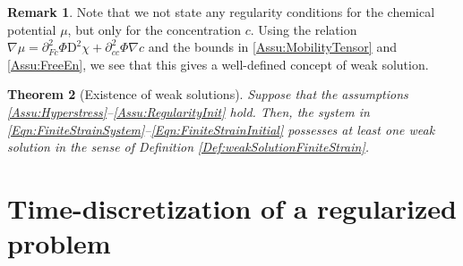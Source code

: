 \documentclass[a4paper,12pt]{article}
\newcommand{\pl}{\partial}
\newcommand{\rmD}{\mathrm{D}}
\theoremstyle{plain}
\newtheorem{Th}{Theorem}[section]
\theoremstyle{definition}
\newtheorem{Rem}[Th]{Remark}
\numberwithin{equation}{section}
\begin{document}
	\begin{Rem}
 Note that we not state any regularity conditions for the chemical potential $\mu$, but only for the concentration $c$. 
 Using the relation $\nabla\mu = \pl^2_{Fc}\Phi\rmD^2\chi + \pl^2_{cc}\Phi\nabla c$ and the bounds in \ref{Assu:MobilityTensor} and \ref{Assu:FreeEn}, we see that this gives a well-defined concept of weak solution.%
	\end{Rem}	
	
	\begin{Th}[Existence of weak solutions]
		\label{Thm:Main}
	Suppose that the assumptions \ref{Assu:Hyperstress}--\ref{Assu:RegularityInit} hold. Then, the system in \eqref{Eqn:FiniteStrainSystem}--\eqref{Eqn:FiniteStrainInitial} possesses at least 
	one weak solution in the sense of Definition \ref{Def:weakSolutionFiniteStrain}.
	\end{Th}

    	
\section{Time-discretization of a regularized problem}
\label{Sect:TimeDiscr}
\end{document}

